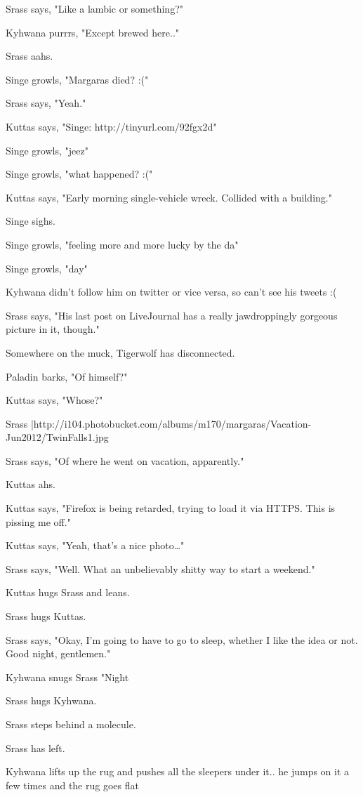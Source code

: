\begin{hangparas}{2em}{1}
Srass says, "Like a lambic or something?"

Kyhwana purrrs, "Except brewed here.."

Srass aahs.

Singe growls, "Margaras died? :("

Srass says, "Yeah."

Kuttas says, "Singe:  http://tinyurl.com/92fgx2d"

Singe growls, "jeez"

Singe growls, "what happened? :("

Kuttas says, "Early morning single-vehicle wreck. Collided with a building."

Singe sighs.

Singe growls, "feeling more and more lucky by the da"

Singe growls, "day"

Kyhwana didn't follow him on twitter or vice versa, so can't see his tweets :(

Srass says, "His last post on LiveJournal has a really jawdroppingly gorgeous picture in it, though."

Somewhere on the muck, Tigerwolf has disconnected.

Paladin barks, "Of himself?"

Kuttas says, "Whose?"

Srass |http://i104.photobucket.com/albums/m170/margaras/Vacation-Jun2012/TwinFalls1.jpg

Srass says, "Of where he went on vacation, apparently."

Kuttas ahs.

Kuttas says, "Firefox is being retarded, trying to load it via HTTPS. This is pissing me off."

Kuttas says, "Yeah, that's a nice photo\ldots{}"

Srass says, "Well.  What an unbelievably shitty way to start a weekend."

Kuttas hugs Srass and leans.

Srass hugs Kuttas.

Srass says, "Okay, I'm going to have to go to sleep, whether I like the idea or not.  Good night, gentlemen."

Kyhwana snugs Srass "Night

Srass hugs Kyhwana.

Srass steps behind a molecule.

Srass has left.

Kyhwana lifts up the rug and pushes all the sleepers under it.. he jumps on it a few times and the rug goes flat


\end{hangparas}
